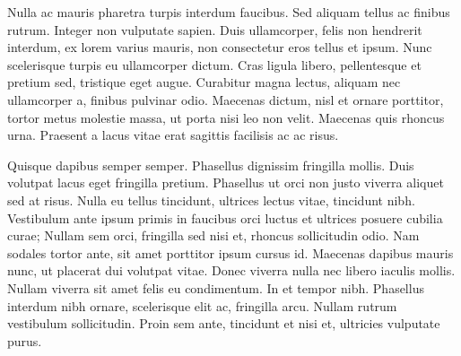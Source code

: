 \vspace{2mm}

Nulla ac mauris pharetra turpis interdum faucibus. Sed aliquam tellus ac finibus rutrum. Integer non vulputate sapien. Duis ullamcorper, felis non hendrerit interdum, ex lorem varius mauris, non consectetur eros tellus et ipsum. Nunc scelerisque turpis eu ullamcorper dictum. Cras ligula libero, pellentesque et pretium sed, tristique eget augue. Curabitur magna lectus, aliquam nec ullamcorper a, finibus pulvinar odio. Maecenas dictum, nisl et ornare porttitor, tortor metus molestie massa, ut porta nisi leo non velit. Maecenas quis rhoncus urna. Praesent a lacus vitae erat sagittis facilisis ac ac risus.

\vspace{2mm}

Quisque dapibus semper semper. Phasellus dignissim fringilla mollis. Duis volutpat lacus eget fringilla pretium. Phasellus ut orci non justo viverra aliquet sed at risus. Nulla eu tellus tincidunt, ultrices lectus vitae, tincidunt nibh. Vestibulum ante ipsum primis in faucibus orci luctus et ultrices posuere cubilia curae; Nullam sem orci, fringilla sed nisi et, rhoncus sollicitudin odio. Nam sodales tortor ante, sit amet porttitor ipsum cursus id. Maecenas dapibus mauris nunc, ut placerat dui volutpat vitae. Donec viverra nulla nec libero iaculis mollis. Nullam viverra sit amet felis eu condimentum. In et tempor nibh. Phasellus interdum nibh ornare, scelerisque elit ac, fringilla arcu. Nullam rutrum vestibulum sollicitudin. Proin sem ante, tincidunt et nisi et, ultricies vulputate purus.
